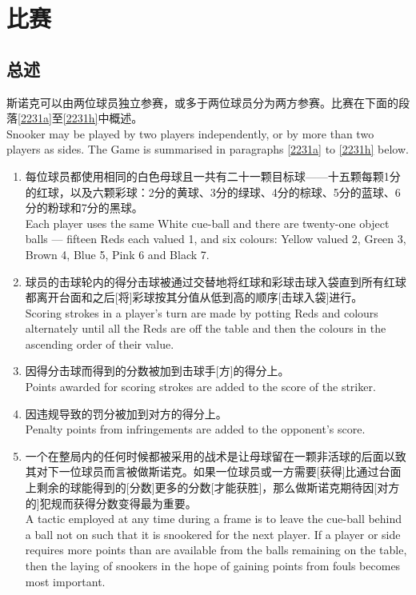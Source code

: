 \section{比赛}\label{223}

\subsection{总述}\label{2231}

\noindent 斯诺克可以由两位球员独立参赛，或多于两位球员分为两方参赛。比赛在下面的段落\ref{2231a}至\ref{2231h}中概述。\\
Snooker may be played by two players independently, or by more than two players as sides. The Game is summarised in paragraphs \ref{2231a} to \ref{2231h} below.
\begin{enumerate}[label=(\alph*)]
    \item \label{2231a}每位球员都使用相同的白色母球且一共有二十一颗目标球——十五颗每颗1分的红球，以及六颗彩球：2分的黄球、3分的绿球、4分的棕球、5分的蓝球、6分的粉球和7分的黑球。\\
    Each player uses the same White cue-ball and there are twenty-one object balls --- fifteen Reds each valued 1, and six colours: Yellow valued 2, Green 3, Brown 4, Blue 5, Pink 6 and Black 7.
    \item 球员的击球轮内的得分击球被通过交替地将红球和彩球击球入袋直到所有红球都离开台面和之后[将]彩球按其分值从低到高的顺序[击球入袋]进行。\\
    Scoring strokes in a player's turn are made by potting Reds and colours alternately until all the Reds are off the table and then the colours in the ascending order of their value.
    \item 因得分击球而得到的分数被加到击球手[方]的得分上。\\
    Points awarded for scoring strokes are added to the score of the striker.
    \item 因违规导致的罚分被加到对方的得分上。\\
    Penalty points from infringements are added to the opponent's score.
    \item 一个在整局内的任何时候都被采用的战术是让母球留在一颗非活球的后面以致其对下一位球员而言被做斯诺克。如果一位球员或一方需要[获得]比通过台面上剩余的球能得到的[分数]更多的分数[才能获胜]，那么做斯诺克期待因[对方的]犯规而获得分数变得最为重要。\\
    A tactic employed at any time during a frame is to leave the cue-ball behind a ball not on such that it is snookered for the next player. If a player or side requires more points than are available from the balls remaining on the table, then the laying of snookers in the hope of gaining points from fouls becomes most important.

\end{enumerate}
